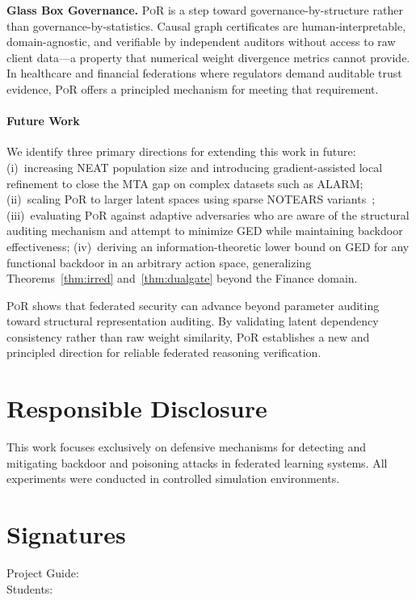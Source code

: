 \documentclass[journal]{IEEEtran}
\newcommand{\por}{\textsc{PoR}}
\newcommand{\notears}{\textsc{NOTEARS}}
\begin{document}
\textbf{Glass Box Governance.} \por{} is a step toward governance-by-structure
rather than governance-by-statistics. Causal graph certificates are
human-interpretable, domain-agnostic, and verifiable by independent auditors
without access to raw client data---a property that numerical weight
divergence metrics cannot provide. In healthcare and financial federations
where regulators demand auditable trust evidence, \por{} offers a principled
mechanism for meeting that requirement.

\paragraph{Future Work}
We identify three primary directions for extending this work in future:
(i)~increasing NEAT population size and introducing gradient-assisted local
refinement to close the MTA gap on complex datasets such as ALARM;
(ii)~scaling \por{} to larger latent spaces using sparse \notears{}
variants~\cite{lachapelle2019grandag};
(iii)~evaluating \por{} against adaptive adversaries who are aware of the
structural auditing mechanism and attempt to minimize GED while maintaining
backdoor effectiveness;
(iv)~deriving an information-theoretic lower bound on GED for any functional
backdoor in an arbitrary action space, generalizing
Theorems~\ref{thm:irred} and~\ref{thm:dualgate} beyond the Finance domain.

\por{} shows that federated security can advance beyond parameter
auditing toward structural representation auditing. By validating latent
dependency consistency rather than raw weight similarity, \por{} establishes
a new and principled direction for reliable federated reasoning verification.

\section*{Responsible Disclosure}
This work focuses exclusively on defensive mechanisms for detecting and
mitigating backdoor and poisoning attacks in federated learning systems.
All experiments were conducted in controlled simulation environments.




\balance

\newpage
\section*{Signatures}
\vspace{2cm}
\begin{center}
Project Guide: \hrulefill \\[1cm]
Students: \hrulefill
\end{center}
\end{document}
